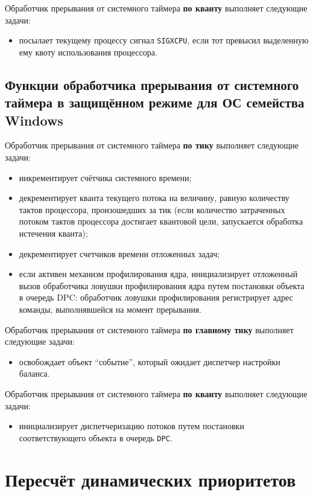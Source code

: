 Обработчик прерывания от системного таймера \textbf{по кванту} выполняет следующие задачи:
\begin{itemize}
    \item посылает текущему процессу сигнал \texttt{SIGXCPU}, если тот превысил выделенную ему квоту использования процессора.
\end{itemize}


\section{Функции обработчика прерывания от системного таймера в защищённом режиме для ОС семейства Windows}

Обработчик прерывания от системного таймера \textbf{по тику} выполняет следующие задачи:
\begin{itemize}
    \item инкрементирует счётчика системного времени;
    \item декрементирует кванта текущего потока на величину, равную количеству тактов процессора, произошедших за тик (если количество затраченных потоком тактов процессора достигает квантовой цели, запускается обработка истечения кванта);
    \item декрементирует счетчиков времени отложенных задач;
    \item если активен механизм профилирования ядра, инициализирует отложенный вызов обработчика ловушки профилирования ядра путем постановки объекта в очередь DPC: обработчик ловушки профилирования регистрирует адрес команды, выполнявшейся на момент прерывания.
\end{itemize}

Обработчик прерывания от системного таймера \textbf{по главному тику} выполняет следующие задачи:
\begin{itemize}
    \item освобождает объект ``событие'', который ожидает диспетчер настройки баланса.
\end{itemize}

Обработчик прерывания от системного таймера \textbf{по кванту} выполняет следующие задачи:
\begin{itemize}
    \item инициализирует диспетчеризацию потоков путем постановки соответствующего объекта в очередь \texttt{DPC}.
\end{itemize}


\chapter{Пересчёт динамических приоритетов}

